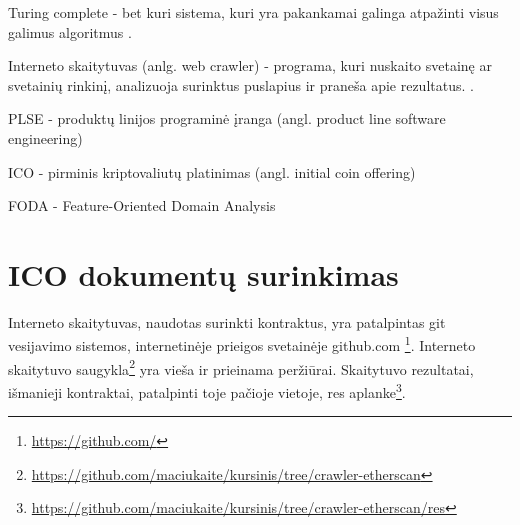 \documentclass{VUMIFPSkursinis}
\begin{document}
Turing complete - bet kuri sistema, kuri yra pakankamai galinga atpažinti visus galimus algoritmus \cite{Teller1994}. 

Interneto skaitytuvas (anlg. web crawler) -  programa, kuri nuskaito svetainę ar svetainių rinkinį, analizuoja surinktus puslapius ir praneša apie rezultatus. \cite{Thelwall2001}.

PLSE - produktų linijos programinė įranga (angl. product line software engineering)

ICO - pirminis kriptovaliutų platinimas (angl. initial coin offering)

FODA - Feature-Oriented Domain Analysis \cite{Kang1990}

\pagebreak

 \appendix   
%

\section {ICO dokumentų surinkimas}

Interneto skaitytuvas, naudotas surinkti kontraktus, yra patalpintas git vesijavimo sistemos, internetinėje prieigos svetainėje github.com \footnote{\url {https://github.com/}}. Interneto skaitytuvo saugykla\footnote{\url{https://github.com/maciukaite/kursinis/tree/crawler-etherscan}} yra vieša ir prieinama peržiūrai. Skaitytuvo rezultatai, išmanieji kontraktai, patalpinti toje pačioje vietoje, res aplanke\footnote{\url{https://github.com/maciukaite/kursinis/tree/crawler-etherscan/res}}.
\end{document}
